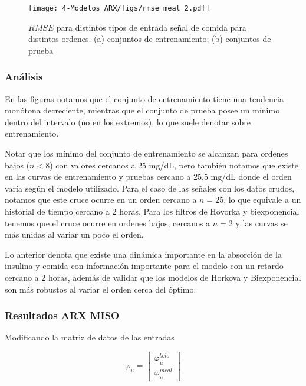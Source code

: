 \begin{figure}[H]
	\centering
	\texttt{[image: 4-Modelos\_ARX/figs/rmse\_meal\_2.pdf]}
	\caption{$RMSE$ para distintos tipos de entrada señal de comida para distintos ordenes. (a) conjuntos de entrenamiento; (b) conjuntos de prueba}
	\label{fig:rmse_meal_2}
\end{figure}



\subsubsection*{Análisis}

En las figuras notamos que el conjunto de entrenamiento tiene una tendencia monótona decreciente, mientras que el conjunto de prueba posee un mínimo dentro del intervalo (no en los extremos), lo que suele denotar sobre entrenamiento.

Notar que los mínimo del conjunto de entrenamiento se alcanzan para ordenes bajos ($n < 8$) con valores cercanos a 25 mg/dL, pero también notamos que existe en las curvas de entrenamiento y pruebas cercano a 25,5 mg/dL donde el orden varía según el modelo utilizado. Para el caso de las señales con los datos crudos, notamos que este cruce ocurre en un orden cercano a $n=25$, lo que equivale a un historial de tiempo cercano a 2 horas. Para los filtros de Hovorka y biexponencial tenemos que el cruce ocurre en ordenes bajos, cercanos a $n=2$ y las curvas se más unidas al variar un poco el orden.

Lo anterior denota que existe una dinámica importante en la absorción de la insulina y comida con información importante para el modelo con un retardo cercano a 2 horas, además de validar que los modelos de Horkova y Biexponencial son más robustos al variar el orden cerca del óptimo.



\subsubsection*{Resultados ARX MISO}


Modificando la matriz de datos de las entradas

\begin{equation}
	\varphi_u = \begin{bmatrix}
	\varphi_u^{bolo} \\ \varphi_u^{meal}
	\end{bmatrix}
\end{equation}


